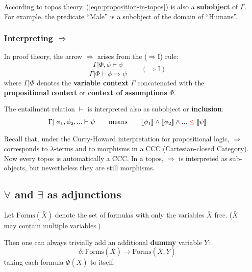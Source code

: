 According to topos theory, (\ref{eqn:proposition-in-topos}) is also a \textbf{subobject} of $\Gamma$.  For example, the predicate ``Male'' is a subobject of the domain of ``Humans''.

\subsubsection{Interpreting $\Rightarrow$}

In proof theory, the arrow $\Rightarrow$ arises from the ($\Rightarrow$I) rule:
\begin{equation}
\frac{ \Gamma | \Phi, \phi \vdash \psi }
{ \Gamma | \Phi \vdash \phi \Rightarrow \psi }
\qquad (\Rightarrow\mathrm{I})
\end{equation}
where $\Gamma | \Phi$ denotes the \textbf{variable context} $\Gamma$ concatenated with the \textbf{propositional context} or \textbf{context of assumptions} $\Phi$.

The entailment relation $\vdash$ is interpreted also as subobject or \textbf{inclusion}:
\begin{equation}
\Gamma | \; \phi_1, \phi_2, ... \vdash \psi
\qquad \mbox{means} \qquad
\llbracket \phi_1 \rrbracket \wedge \llbracket \phi_2 \rrbracket \wedge ... \; {\color{red}\le} \; \llbracket \psi \rrbracket
\end{equation}

Recall that, under the Curry-Howard interpretation for propositional logic, $\Rightarrow$ corresponds to $\lambda$-terms and to morphisms in a CCC (Cartesian-closed Category).  Now every topos is automatically a CCC.  In a topos, $\Rightarrow$ is interpreted as sub-objects, but nevertheless they are still morphisms.

\subsection{$\forall$ and $\exists$ as adjunctions}

Let $\mbox{Forms}(\bar{X})$ denote the set of formulas with only the variables $\bar{X}$ free. ($\bar{X}$ may contain multiple variables.)

Then one can always trivially add an additional \textbf{dummy} variable $Y$:
\begin{equation}
\delta : \mbox{Forms}(\bar{X}) \rightarrow \mbox{Forms}(\bar{X}, Y)
\end{equation}
taking each formula $\Phi(\bar{X})$ to itself.

